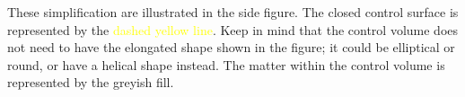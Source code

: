 \documentclass[a4paper,12pt,%
onecolumn,oneside,%
british%
]{memoir}
\renewcommand*{\|}[1][]{\nonscript\:#1\vert\nonscript\:\mathopen{}}
\begin{document}
%
%
These simplification are illustrated in the side figure. The closed control surface is represented by the \textcolor{yellow}{dashed yellow line}. Keep in mind that the control volume does not need to have the elongated shape shown in the figure; it could be elliptical or round, or have a helical shape instead. The matter within the control volume is represented by the \textcolor{midgrey}{greyish fill}.
\end{document}
